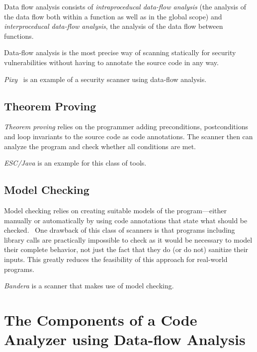 Data flow analysis consists of \emph{intraproceducal data-flow analysis} (\ie the analysis of the data flow both within a function as well as in the global scope) and \emph{interproceducal data-flow analysis}, \ie the analysis of the data flow between functions.

Data-flow analysis is the most precise way of scanning statically for security vulnerabilities without having to annotate the source code in any way.~\cite{comparison-of-bug-finding-tools}

\emph{Pixy}~\cite{pixy} is an example of a security scanner using data-flow analysis.


\subsection{Theorem Proving}

\emph{Theorem proving} relies on the programmer adding preconditions, postconditions and loop invariants to the source code as code annotations. The scanner then can analyze the program and check whether all conditions are met.~\cite{comparison-of-bug-finding-tools}

\emph{ESC/Java} is an example for this class of tools.


\subsection{Model Checking}

Model checking relies on creating suitable models of the program---either manually or automatically by using code annotations that state what should be checked.~\cite{data-flow-analysis} One drawback of this class of scanners is that programs including library calls are practically impossible to check as it would be necessary to model their complete behavior, not just \eg the fact that they do (or do not) sanitize their inputs. This greatly reduces the 	feasibility of this approach for real-world programs.~\cite{comparison-of-bug-finding-tools}

\emph{Bandera} is a scanner that makes use of model checking.



\section{The Components of a Code Analyzer using Data-flow Analysis}

